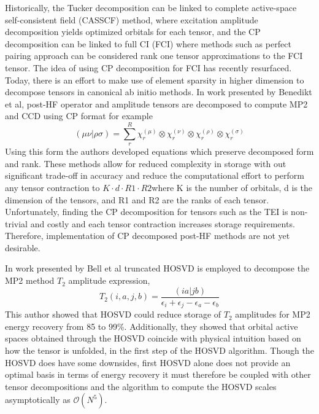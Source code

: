 	  Historically, the Tucker decomposition can be linked to complete active-space self-consistent field (CASSCF) method\cite{Roos 1980}, where excitation amplitude decomposition yields optimized orbitals for each tensor, and the CP decomposition can be linked to full CI\cite{Bell 2010} (FCI) where methods such as perfect pairing approach can be considered rank one tensor approximations to the FCI tensor. The idea of using CP decomposition for FCI has recently resurfaced\cite{Uemura 2012, Bohm 2016}. Today, there is an effort to make use of element sparsity in higher dimension to decompose tensors in canonical ab initio methods. In work presented by Benedikt et al\cite{Benedikt 2011, Benedikt 2013, Benedikt 2014}, post-HF operator and amplitude tensors are decomposed to compute MP2 and CCD using CP format for example
	  	\begin{equation}
	  		(\mu\nu|\rho\sigma) = \sum_r^R \chi^{(\mu)}_r \otimes \chi^{(\nu)}_r \otimes \chi^{(\rho)}_r \otimes \chi^{(\sigma)}_r
	  	\end{equation}
	  Using this form the authors developed equations which preserve decomposed form and rank.  These methods allow for reduced complexity in storage with out significant trade-off in accuracy and reduce the computational effort to perform any tensor contraction to $K \cdot d \cdot R1 \cdot R2$where K is the number of orbitals, d is the dimension of the tensors, and R1 and R2 are the ranks of each tensor. Unfortunately, finding the CP decomposition for tensors such as the TEI is non-trivial and costly and each tensor contraction increases storage requirements. Therefore, implementation of CP decomposed post-HF methods are not yet desirable.

	  In work presented by Bell et al\cite{Bell 2010} truncated HOSVD is employed to decompose the MP2 method $T_2$ amplitude expression, 
	  	\begin{equation}
	  		T_2(i,a,j,b) = \frac{(ia|jb)}{\epsilon_i + \epsilon_j - \epsilon_a - \epsilon_b}
	  	\end{equation}
	  This author showed that HOSVD could reduce storage of $T_2$ amplitudes for MP2 energy recovery from 85 to 99\%.  Additionally, they showed that orbital active spaces obtained through the HOSVD coincide with physical intuition based on how the tensor is unfolded, in the first step of the HOSVD algorithm.  Though the HOSVD does have some downsides, first HOSVD alone does not provide an optimal basis in terms of energy recovery it must therefore be coupled with other tensor decompositions and the algorithm to compute the HOSVD scales asymptotically as $\mathcal{O}(N^5)$\cite{Bell 2010}.
